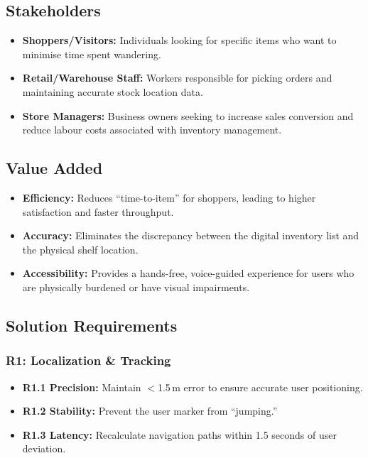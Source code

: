 \documentclass[12pt,a4paper]{article}
\begin{document}
\subsection*{Stakeholders}

\begin{itemize}
    \item \textbf{Shoppers/Visitors:} Individuals looking for specific items
    who want to minimise time spent wandering.

    \item \textbf{Retail/Warehouse Staff:} Workers responsible for picking
    orders and maintaining accurate stock location data.

    \item \textbf{Store Managers:} Business owners seeking to increase sales
    conversion and reduce labour costs associated with inventory management.
\end{itemize}

\subsection*{Value Added}

\begin{itemize}
    \item \textbf{Efficiency:} Reduces ``time-to-item'' for shoppers, leading
    to higher satisfaction and faster throughput.

    \item \textbf{Accuracy:} Eliminates the discrepancy between the digital
    inventory list and the physical shelf location.

    \item \textbf{Accessibility:} Provides a hands-free, voice-guided
    experience for users who are physically burdened or have visual
    impairments.
\end{itemize}

\subsection{Solution Requirements}

\subsubsection*{R1: Localization \& Tracking}
\begin{itemize}
    \item \textbf{R1.1 Precision:} Maintain $<$1.5\,m error to ensure accurate
    user positioning.
    \item \textbf{R1.2 Stability:} Prevent the user marker from ``jumping.''
    \item \textbf{R1.3 Latency:} Recalculate navigation paths within 1.5
    seconds of user deviation.
\end{itemize}
\end{document}
